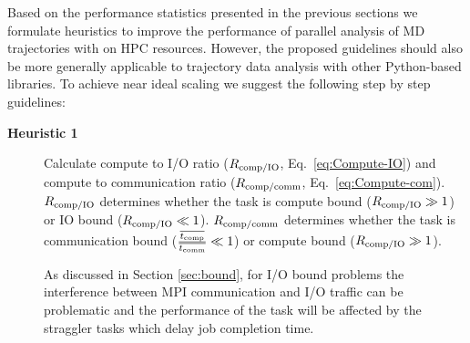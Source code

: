 \label{sec:guidelines}

Based on the performance statistics presented in the previous sections we formulate heuristics to improve the performance of parallel analysis of MD trajectories with  on HPC resources.
However, the proposed guidelines should also be more generally applicable to trajectory data analysis with other Python-based libraries.
To achieve near ideal scaling we suggest the following step by step guidelines:

\begin{description}
\item[\textbf{Heuristic 1}] Calculate compute to I/O ratio ($R_{\text{comp/IO}}$, Eq.~\ref{eq:Compute-IO}) and compute to communication ratio ($R_{\text{comp/comm}}$, Eq.~\ref{eq:Compute-com}).
  $R_{\text{comp/IO}}$ determines whether the task is compute bound ($R_{\text{comp/IO}} \gg 1$) or IO bound ($R_{\text{comp/IO}} \ll 1$).
  $R_{\text{comp/comm}}$ determines whether the task is communication bound ($\frac{\overline{{t}_{\text{comp}}}}{\overline{t_{\text{comm}}}} \ll 1$) or compute bound ($R_{\text{comp/IO}} \gg 1$).

  As discussed in Section \ref{sec:bound}, for I/O bound problems the interference between MPI communication and I/O traffic can be problematic \cite{VMD2013, Kevin2018, Brown:2018ab} and the performance of the task will be affected by the straggler tasks which delay job completion time.
  

\end{description}
